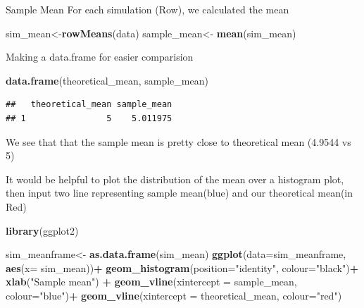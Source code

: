 \documentclass[
]{article}
\newenvironment{Shaded}{\begin{snugshade}}{\end{snugshade}}
\newcommand{\DataTypeTok}[1]{\textcolor[rgb]{0.13,0.29,0.53}{#1}}
\newcommand{\KeywordTok}[1]{\textcolor[rgb]{0.13,0.29,0.53}{\textbf{#1}}}
\newcommand{\NormalTok}[1]{#1}
\newcommand{\OperatorTok}[1]{\textcolor[rgb]{0.81,0.36,0.00}{\textbf{#1}}}
\newcommand{\StringTok}[1]{\textcolor[rgb]{0.31,0.60,0.02}{#1}}
\begin{document}
Sample Mean For each simulation (Row), we calculated the mean

\begin{Shaded}
\begin{Highlighting}[]
\NormalTok{sim_mean<-}\KeywordTok{rowMeans}\NormalTok{(data)}
\NormalTok{sample_mean<-}\StringTok{ }\KeywordTok{mean}\NormalTok{(sim_mean)}
\end{Highlighting}
\end{Shaded}

Making a data.frame for easier comparision

\begin{Shaded}
\begin{Highlighting}[]
\KeywordTok{data.frame}\NormalTok{(theoretical_mean, sample_mean)}
\end{Highlighting}
\end{Shaded}

\begin{verbatim}
##   theoretical_mean sample_mean
## 1                5    5.011975
\end{verbatim}

We see that that the sample mean is pretty close to theoretical mean
(4.9544 vs 5)

It would be helpful to plot the distribution of the mean over a
histogram plot, then input two line representing sample mean(blue) and
our theoretical mean(in Red)

\begin{Shaded}
\begin{Highlighting}[]
\KeywordTok{library}\NormalTok{(ggplot2)}
\end{Highlighting}
\end{Shaded}

\begin{Shaded}
\begin{Highlighting}[]
\NormalTok{sim_meanframe<-}\StringTok{ }\KeywordTok{as.data.frame}\NormalTok{(sim_mean)}
\KeywordTok{ggplot}\NormalTok{(}\DataTypeTok{data=}\NormalTok{sim_meanframe, }\KeywordTok{aes}\NormalTok{(}\DataTypeTok{x=}\NormalTok{ sim_mean))}\OperatorTok{+}
\StringTok{       }\KeywordTok{geom_histogram}\NormalTok{(}\DataTypeTok{position=}\StringTok{"identity"}\NormalTok{, }\DataTypeTok{colour=}\StringTok{"black"}\NormalTok{)}\OperatorTok{+}
\StringTok{       }\KeywordTok{xlab}\NormalTok{(}\StringTok{"Sample mean"}\NormalTok{) }\OperatorTok{+}\StringTok{ }\KeywordTok{geom_vline}\NormalTok{(}\DataTypeTok{xintercept =}\NormalTok{ sample_mean, }\DataTypeTok{colour=}\StringTok{"blue"}\NormalTok{)}\OperatorTok{+}
\StringTok{       }\KeywordTok{geom_vline}\NormalTok{(}\DataTypeTok{xintercept =}\NormalTok{ theoretical_mean, }\DataTypeTok{colour=}\StringTok{"red"}\NormalTok{)}
\end{Highlighting}
\end{Shaded}
\end{document}
